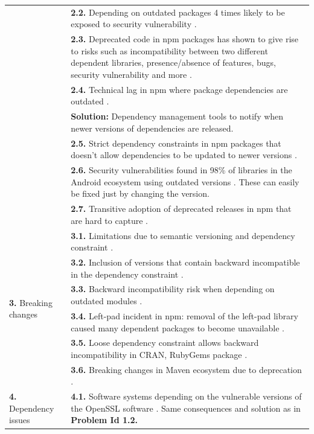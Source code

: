 \documentclass[conference]{IEEEtran}
\begin{document}
\begin{table}[!t]
\begin{tabular}{|p{3cm}|p{14cm}|}
					      & \textbf{2.2.} Depending on outdated packages 4 times likely to  be exposed to security vulnerability \cite{cox2015measuring}.  \\	
					      & \textbf{2.3.} Deprecated code in npm packages has shown to give rise to risks such as incompatibility between two different dependent libraries, presence/absence of features, bugs, security vulnerability and more \cite{cogo2021deprecation}. \\
					      & \textbf{2.4.} Technical lag in npm where package dependencies are outdated \cite{decan2018evolution}.  \\
					      & \textbf{Solution:} Dependency management tools to notify when newer versions of dependencies are released.\\
					      & \textbf{2.5.} Strict dependency constraints in npm packages that doesn’t allow dependencies to be updated to newer versions \cite{decan2018evolution}.  \\
					      & \textbf{2.6.} Security vulnerabilities found in 98\% of libraries in the Android ecosystem using outdated versions \cite{decan2018evolution}. These can easily be fixed just by changing the version. \\
					      & \textbf{2.7.} Transitive adoption of deprecated releases in npm that are hard to capture \cite{cogo2021deprecation}.  \\
        \hline
        \multirow{6}{*}{\textbf{3.} Breaking changes} & \textbf{3.1.} Limitations due to semantic versioning and dependency constraint \cite{decan2018impact}. \\
						    & \textbf{3.2.} Inclusion of versions that contain backward incompatible in the dependency constraint \cite{decan2018impact}.  \\
						    &\textbf{3.3.} Backward incompatibility risk when depending on outdated modules \cite{decan2018impact}.  \\
						    & \textbf{3.4.} Left-pad incident in npm: removal of the left-pad library caused many dependent packages to become unavailable \cite{zimmermann2019small}. \\
						    & \textbf{3.5.} Loose dependency constraint allows backward incompatibility in CRAN, RubyGems package \cite{decan2018evolution}.\\
						   & \textbf{3.6.}  Breaking changes in Maven ecosystem due to deprecation \cite{decan2018evolution}.\\
       \hline
        \multirow{7}{*}{\textbf{4.} Dependency issues} & \textbf{4.1.} Software systems depending on the vulnerable versions of the  OpenSSL software \cite{decan2018impact} . Same consequences and solution as in \textbf{Problem Id 1.2.}\\

\end{tabular}
\end{table}
\end{document}
